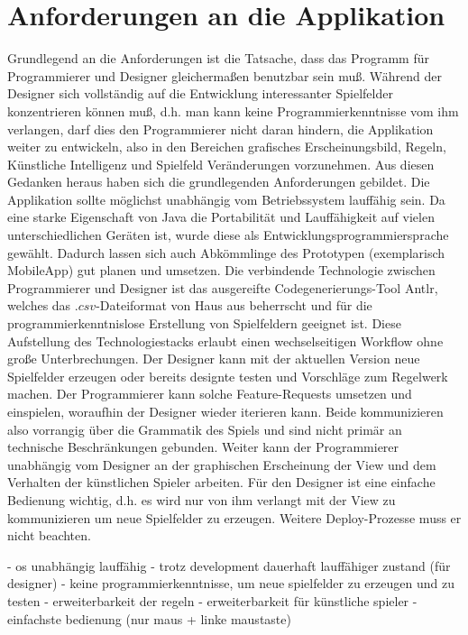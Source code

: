 \documentclass[conference]{IEEEtran}
\begin{document}
\section{Anforderungen an die Applikation}

Grundlegend an die Anforderungen ist die Tatsache, dass das Programm f\"ur Programmierer und Designer gleicherma\ss en benutzbar sein mu\ss. W\"ahrend der Designer sich vollst\"andig auf die Entwicklung interessanter Spielfelder konzentrieren k\"onnen mu\ss, d.h. man kann keine Programmierkenntnisse vom ihm verlangen, darf dies den Programmierer nicht daran hindern, die Applikation weiter zu entwickeln, also
in den Bereichen grafisches Erscheinungsbild, Regeln, K\"unstliche Intelligenz und Spielfeld Ver\"anderungen vorzunehmen. Aus diesen Gedanken
heraus haben sich die grundlegenden Anforderungen gebildet.
Die Applikation sollte m\"oglichst unabh\"angig vom Betriebssystem lauff\"ahig sein. Da eine starke Eigenschaft von Java die Portabilit\"at und
Lauff\"ahigkeit auf vielen unterschiedlichen Ger\"aten ist, wurde diese als Entwicklungsprogrammiersprache gew\"ahlt. Dadurch lassen sich auch Abk\"ommlinge
des Prototypen (exemplarisch MobileApp) gut planen und umsetzen. Die verbindende Technologie zwischen Programmierer und Designer ist das ausgereifte
Codegenerierungs-Tool Antlr, welches das $.csv$-Dateiformat von Haus aus beherrscht und f\"ur die programmierkenntnislose Erstellung von Spielfeldern
geeignet ist. Diese Aufstellung des Technologiestacks erlaubt einen wechselseitigen Workflow ohne gro\ss e Unterbrechungen. Der Designer kann
mit der aktuellen Version neue Spielfelder erzeugen oder bereits designte testen und Vorschl\"age zum Regelwerk machen. Der Programmierer
kann solche Feature-Requests umsetzen und einspielen, woraufhin der Designer wieder iterieren kann. Beide kommunizieren also vorrangig
\"uber die Grammatik des Spiels und sind nicht prim\"ar an technische Beschr\"ankungen gebunden. Weiter kann der Programmierer unabh\"angig vom Designer
an der graphischen Erscheinung der View und dem Verhalten der k\"unstlichen Spieler arbeiten. F\"ur den Designer ist eine einfache Bedienung
wichtig, d.h. es wird nur von ihm verlangt mit der View zu kommunizieren um neue Spielfelder zu erzeugen. Weitere Deploy-Prozesse muss er nicht beachten.


- os unabh\"angig lauff\"ahig
- trotz development dauerhaft lauff\"ahiger zustand (f\"ur designer)
- keine programmierkenntnisse, um neue spielfelder zu erzeugen und zu testen
- erweiterbarkeit der regeln
- erweiterbarkeit f\"ur k\"unstliche spieler
- einfachste bedienung (nur maus + linke maustaste)
\end{document}
